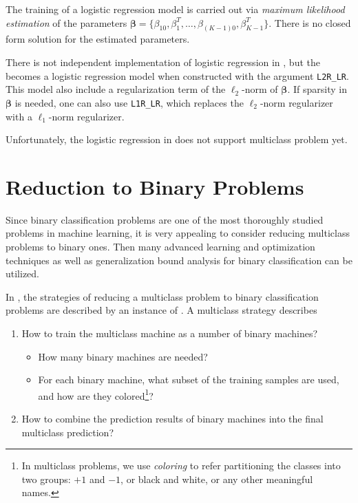 The training of a logistic regression model is carried out via \emph{maximum
    likelihood estimation} of the parameters
$\boldsymbol\beta = \{\beta_{10},\beta_1^T,\ldots,\beta_{(K-1)0},\beta_{K-1}^T\}$. There is no
closed form solution for the estimated parameters.

There is not independent implementation of logistic regression in \shogun{}, 
but the  becomes a logistic regression model when
constructed with the argument \Verb|L2R_LR|. This model also include a
regularization term of the $\ell_2$-norm of $\boldsymbol\beta$. If sparsity in
$\boldsymbol\beta$ is needed, one can also use \Verb|L1R_LR|, which replaces
the $\ell_2$-norm regularizer with a $\ell_1$-norm regularizer.

Unfortunately, the logistic regression in \shogun{} does not support multiclass
problem yet.

\section{Reduction to Binary Problems}
\label{sec:multiclass-reduction}

Since binary classification problems are one of the most thoroughly studied
problems in machine learning, it is very appealing to consider reducing
multiclass problems to binary ones. Then many advanced learning and
optimization techniques as well as generalization bound analysis for binary
classification can be utilized.

In \shogun{}, the strategies of reducing a multiclass problem to binary
classification problems are described by an instance of
. A multiclass strategy describes
\begin{enumerate}
\item How to train the multiclass machine as a number of binary machines?
	\begin{itemize}
		\item How many binary machines are needed?
		\item For each binary machine, what subset of the training samples are
			used, and how are they colored\footnote{In multiclass problems, we
				use \emph{coloring} to refer partitioning the classes into two
				groups: $+1$ and $-1$, or black and white, or any other meaningful
				names.}?
	\end{itemize}
\item How to combine the prediction results of binary machines into the final
	multiclass prediction?
\end{enumerate}

